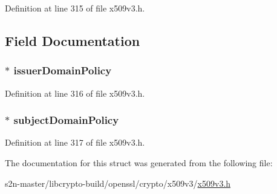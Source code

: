 Definition at line 315 of file x509v3.\+h.



\subsection{Field Documentation}
\subsubsection[{\texorpdfstring{issuer\+Domain\+Policy}{issuerDomainPolicy}}]{ $\ast$ issuer\+Domain\+Policy}\hypertarget{struct_p_o_l_i_c_y___m_a_p_p_i_n_g__st_a840f03761805c8d6b79c39f644f1f563}{}\label{struct_p_o_l_i_c_y___m_a_p_p_i_n_g__st_a840f03761805c8d6b79c39f644f1f563}


Definition at line 316 of file x509v3.\+h.

\subsubsection[{\texorpdfstring{subject\+Domain\+Policy}{subjectDomainPolicy}}]{ $\ast$ subject\+Domain\+Policy}\hypertarget{struct_p_o_l_i_c_y___m_a_p_p_i_n_g__st_a6dfa36751e3ebb76daab87a3f0968539}{}\label{struct_p_o_l_i_c_y___m_a_p_p_i_n_g__st_a6dfa36751e3ebb76daab87a3f0968539}


Definition at line 317 of file x509v3.\+h.



The documentation for this struct was generated from the following file\+:\begin{DoxyCompactItemize}
\item 
s2n-\/master/libcrypto-\/build/openssl/crypto/x509v3/\hyperlink{crypto_2x509v3_2x509v3_8h}{x509v3.\+h}\end{DoxyCompactItemize}

